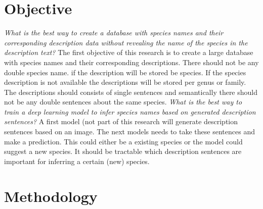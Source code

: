 \documentclass{article}
\begin{document}
\section{Objective}
\emph{What is the best way to create a database with species names and their corresponding description data without revealing the name of the species in the description text?}
\newline
\newline
\noindent    
The first objective of this research is to create a large database with species names and their corresponding descriptions. There should not be any double species name. if the description will be stored be species. If the species description is not available the descriptions will be stored per genus or family. The descriptions should consists of single sentences and semantically there should not be any double sentences about the same species.
\noindent    
\newline
\newline
\emph{What is the best way to train a deep learning model to infer species names based on generated description sentences?}
\newline
\newline
\noindent  
A first model (not part of this research will generate description sentences based on an image. The next models needs to take these sentences and make a prediction. This could either be a existing species or the model could suggest a new species. It should be tractable which description sentences are important for inferring a certain (new) species.
    




\section{Methodology}
\end{document}

